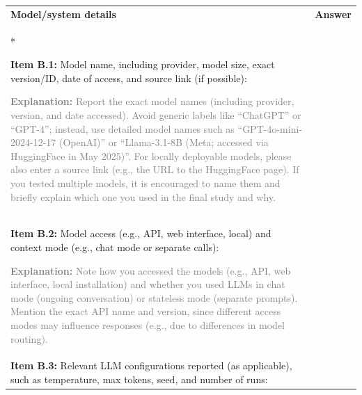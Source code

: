 \documentclass[12pt]{article}
\begin{document}
\begin{longtable}{|p{}|p{}|}
\hline
\rowcolor{green!20}
\textbf{Model/system details
} & \textbf{Answer} \\*   %
\hline

\textbf{Item B.1:} Model name, including provider, model size, exact version/ID, date of access, and source link (if possible):

\textcolor{gray}{{\footnotesize
\textbf{Explanation:} Report the exact model names (including provider, version, and date accessed). Avoid generic labels like “ChatGPT” or “GPT-4”; instead, use detailed model names such as “GPT-4o-mini-2024-12-17 (OpenAI)” or “Llama-3.1-8B (Meta; accessed via HuggingFace in May 2025)”. For locally deployable models, please also enter a source link (e.g., the URL to the HuggingFace page). If you tested multiple models, it is encouraged to name them and briefly explain which one you used in the final study and why.}}
&   \\
\hline
\textbf{Item B.2:} Model access (e.g., API, web interface, local) and context mode (e.g., chat mode or separate calls):

\textcolor{gray}{{\footnotesize
\textbf{Explanation:} Note how you accessed the models (e.g., API, web interface, local installation) and whether you used LLMs in chat mode (ongoing conversation) or stateless mode (separate prompts). Mention the exact API name and version, since different access modes may influence responses (e.g., due to differences in model routing). }}  &   \\
\hline
\textbf{Item B.3:} Relevant LLM configurations reported (as applicable), such as temperature, max tokens, seed, and number of runs:


\end{longtable}
\end{document}
